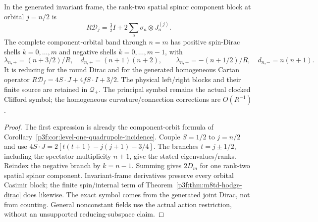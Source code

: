 \documentclass[12pt,a4paper]{article}
\begin{document}
\begin{proposition}
\label{p10:prop:v2189-orbital-dirac-symbol}
In the generated invariant frame, the rank-two spatial spinor component
block at orbital $j=n/2$ is
\[
 R\mathcal D_j=\tfrac32I+2\sum_a\sigma_a\otimes J_a^{(j)}.
\]
The complete component-orbital band through $n=m$ has positive spin-Dirac
shells $k=0,\ldots,m$ and negative shells $k=0,\ldots,m-1$, with
\[
 \lambda_{n,+}=(n+3/2)/R,
 \quad d_{n,+}=(n+1)(n+2),\qquad
 \lambda_{n,-}=-(n+1/2)/R,
 \quad d_{n,-}=n(n+1).
\]
It is reducing for the round Dirac and for the generated homogeneous
Cartan operator
$R\mathcal D_f=4S\cdot J+4fS\cdot I+3/2$.
The physical left/right blocks and their finite source are retained in
$\mathcal Q_+$. The principal symbol remains the actual clocked Clifford
symbol; the homogeneous curvature/connection corrections are $O(R^{-1})$.
\end{proposition}
\begin{proof}
The first expression is already the component-orbit formula of
Corollary~\ref{p3f:cor:level-one-quadrupole-incidence}.
Couple $S=1/2$ to $j=n/2$ and use
$4S\cdot J=2[t(t+1)-j(j+1)-3/4]$.
The branches $t=j\pm1/2$, including the spectator multiplicity $n+1$,
give the stated eigenvalues/ranks. Reindex the negative branch by $k=n-1$.
Summing gives $2D_m$ for one rank-two spatial spinor component.
Invariant-frame derivatives preserve every orbital Casimir block; the
finite spin/internal term of Theorem~\ref{p3f:thm:m8td-hodge-dirac} does
likewise. The exact symbol comes from the generated joint Dirac, not from
counting. General nonconstant fields use the actual action restriction,
without an unsupported reducing-subspace claim.
\end{proof}
\end{document}
